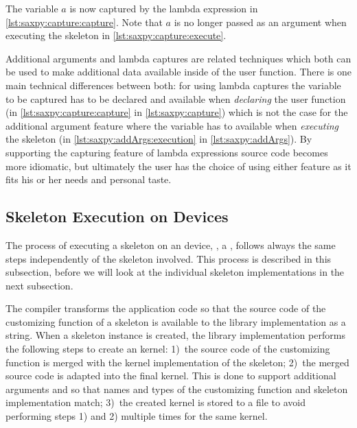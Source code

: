 The variable $a$ is now captured by the lambda expression in \autoref{lst:saxpy:capture:capture}.
Note that $a$ is no longer passed as an argument when executing the skeleton in \autoref{lst:saxpy:capture:execute}.

\vspace{1em}

Additional arguments and lambda captures are related techniques which both can be used to make additional data available inside of the user function.
There is one main technical differences between both:
for using lambda captures the variable to be captured has to be declared and available when \emph{declaring} the user function (in \autoref{lst:saxpy:capture:capture} in \autoref{lst:saxpy:capture}) which is not the case for the additional argument feature where the variable has to available when \emph{executing} the skeleton (in \autoref{lst:saxpy:addArgs:execution} in \autoref{lst:saxpy:addArgs}).
By supporting the capturing feature of lambda expressions \SkelCL source code becomes more \Cpp idiomatic, but ultimately the user has the choice of using either feature as it fits his or her needs and personal taste.








\subsection{Skeleton Execution on \OpenCL Devices}
\label{section:skelcl-library:execution}
The process of executing a skeleton on an \OpenCL device, \eg, a \GPU, follows always the same steps independently of the skeleton involved.
This process is described in this subsection, before we will look at the individual skeleton implementations in the next subsection.

The  compiler transforms the \SkelCL application code so that the source code of the customizing function of a skeleton is available to the \SkelCL library implementation as a string.
When a skeleton instance is created, the \SkelCL library implementation performs the following steps to create an \OpenCL kernel:
1)~the source code of the customizing function is merged with the \OpenCL kernel implementation of the skeleton;
2)~the merged source code is adapted into the final \OpenCL kernel. This is done to support additional arguments and so that names and types of the customizing function and skeleton implementation match;
3)~the created \OpenCL kernel is stored to a file to avoid performing steps 1) and 2) multiple times for the same kernel.

